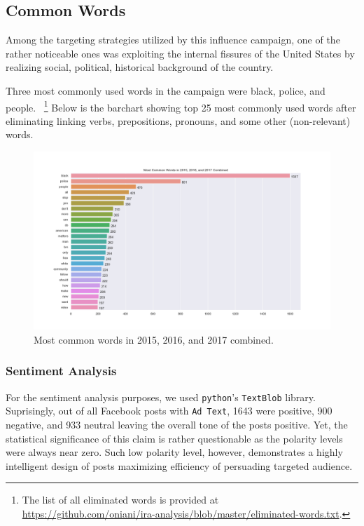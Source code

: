 \documentclass[12pt]{article}
\theoremstyle{definition}
\begin{document}
\subsection*{\centering Common Words}

Among the targeting strategies utilized by this influence campaign, one of the
rather noticeable ones was exploiting the internal fissures of the United States
by realizing social, political, historical background of the country.

\bigskip

Three most commonly used words in the campaign were black, police, and people.
~\footnote{The list of all eliminated words is provided at\\
\url{https://github.com/oniani/ira-analysis/blob/master/eliminated-words.txt}.}
Below is the barchart showing top 25 most commonly used words after eliminating
linking verbs, prepositions, pronouns, and some other (non-relevant) words.

\begin{figure}[H]
\centering
\includegraphics[width=\columnwidth]{./image/barchart-plots/barchart_word_counts.png}
\caption*{Most common words in 2015, 2016, and 2017 combined.}
\end{figure}


\subsubsection*{\centering Sentiment Analysis}
For the sentiment analysis purposes, we used \texttt{python}'s \texttt{TextBlob}
library. Suprisingly, out of all Facebook posts with \texttt{Ad Text}, 1643 were
positive, 900 negative, and 933 neutral leaving the overall tone of the posts
positive. Yet, the statistical significance of this claim is rather questionable
as the polarity levels were always near zero. Such low polarity level, however,
demonstrates a highly intelligent design of posts maximizing efficiency of
persuading targeted audience.
\end{document}
